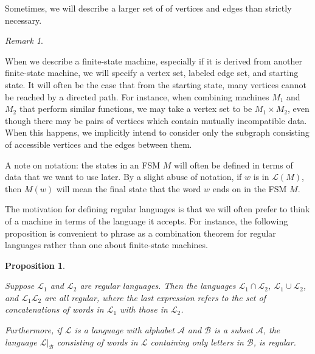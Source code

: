 \documentclass{amsart}
\newtheorem{proposition}[theorem]{Proposition}
\theoremstyle{definition}
\theoremstyle{remark}
\newtheorem{remark}[theorem]{Remark}
\begin{document}
	Sometimes, we will describe a larger set of of vertices and edges than strictly necessary.
	
	\begin{remark}\label{DescribingFSMs}
		
		When we describe a finite-state machine, especially if it is derived from another finite-state machine, we will specify a vertex set, labeled edge set, and starting state. It will often be the case that from the starting state, many vertices cannot be reached by a directed path. For instance, when combining machines $M_1$ and $M_2$ that perform similar functions, we may take a vertex set to be $M_1\times M_2$, even though there may be pairs of vertices which contain mutually incompatible data. When this happens, we implicitly intend to consider only the subgraph consisting of accessible vertices and the edges between them. 
		
	\end{remark}
	
	A note on notation: the states in an FSM $M$ will often be defined in terms of data that we want to use later. By a slight abuse of notation, if $w$ is in $\mathscr{L}(M)$, then $M(w)$ will mean the final state that the word $w$ ends on in the FSM $M$. 
	
	The motivation for defining regular languages is that we will often prefer to think of a machine in terms of the language it accepts. For instance, the following proposition is convenient to phrase as a combination theorem for regular languages rather than one about finite-state machines.
	
	\begin{proposition}\label{CombiningFSMs}
		
		Suppose $\mathscr{L}_1$ and $\mathscr{L}_2$ are regular languages. Then the languages \newline $\mathscr{L}_1\cap \mathscr{L}_2$, $\mathscr{L}_1\cup \mathscr{L}_2$, and $\mathscr{L}_1\mathscr{L}_2$ are all regular, where the last expression refers to the set of concatenations of words in $\mathscr{L}_1$ with those in $\mathscr{L}_2$.
		
		Furthermore, if $\mathscr{L}$ is a language with alphabet $\mathscr{A}$ and $\mathscr{B}$ is a subset $\mathscr{A}$, the language $\mathscr{L}|_{\mathscr{B}}$ consisting of words in $\mathscr{L}$ containing only letters in $\mathscr{B}$, is regular.
		
	\end{proposition}
	
\end{document}
